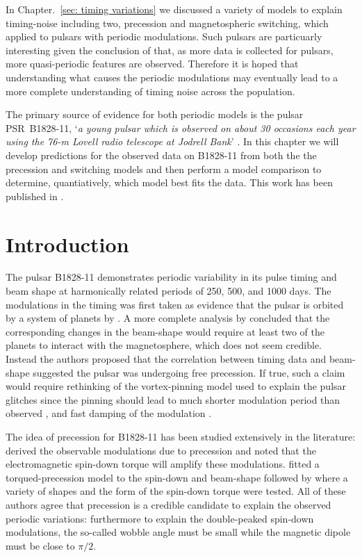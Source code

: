 \documentclass[../full_thesis/full_thesis.tex]{subfiles}
\newcommand{\thisdir}{../comparing_periodic_modulations}
\begin{document}

In Chapter.~\ref{sec: timing variations} we discussed a variety of models to
explain timing-noise including two, precession and magnetospheric switching,
which applied to pulsars with periodic modulations. Such pulsars are particuarly
interesting given the conclusion of \citet{Hobbs2010} that, as more data is
collected for pulsars, more quasi-periodic features are observed. Therefore it
is hoped that understanding what causes the periodic modulations may eventually
lead to a more complete understanding of timing noise across the population.

The primary source of evidence for both periodic models is the pulsar
PSR~B1828-11, `\emph{a young pulsar which is observed on about 30 occasions
each year using the 76-m Lovell radio telescope at Jodrell Bank}'
\citep{Stairs2000}.  In this chapter we will develop predictions for the
observed data on B1828-11 from both the the precession and switching models and
then perform a model comparison to determine, quantiatively, which model best
fits the data. This work has been published in \citet{Ashton2015}.

\section{Introduction}
\label{sec: introduction}

The pulsar B1828-11 demonstrates periodic variability in its pulse timing and
beam shape at harmonically related periods of 250, 500, and 1000 days. The
modulations in the timing was first taken as evidence that the pulsar is
orbited by a system of planets by \citet{Bailes1993}. A more complete analysis
by \citet{Stairs2000} concluded that the corresponding changes in the
beam-shape would require at least two of the planets to interact with the
magnetosphere, which does not seem credible. Instead the authors proposed that
the correlation between timing data and beam-shape suggested the pulsar was
undergoing free precession. If true, such a claim would require rethinking of
the vortex-pinning model used to explain the pulsar glitches since the pinning
should lead to much shorter modulation period than observed \citep{Shaham1977},
and fast damping of the modulation \citep{Link2003}.

The idea of precession for B1828-11 has been studied extensively in the
literature: \citet{Jones2001} derived the observable modulations due to
precession and noted that the electromagnetic spin-down torque will amplify
these modulations.  \citet{Link2001} fitted a torqued-precession model to the
spin-down and beam-shape followed by \citet{Akgun2006} where a variety of
shapes and the form of the spin-down torque were tested.  All of these authors
agree that precession is a credible candidate to explain the observed periodic
variations: furthermore to explain the double-peaked spin-down modulations, the
so-called wobble angle must be small while the magnetic dipole must be close to
$\pi/2$.
\end{document}
